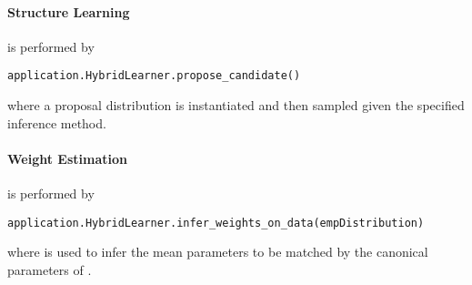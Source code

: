 \paragraph{Structure Learning}
is performed by
\begin{lstlisting}
application.HybridLearner.propose_candidate()
\end{lstlisting}
where a proposal distribution is instantiated and then sampled given the specified inference method.

\paragraph{Weight Estimation}
is performed by
\begin{lstlisting}
application.HybridLearner.infer_weights_on_data(empDistribution)
\end{lstlisting}
where  is used to infer the mean parameters to be matched by the canonical parameters of .